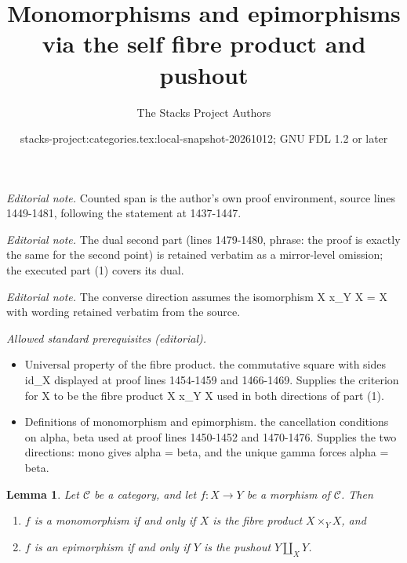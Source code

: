 \documentclass{stacks-project}
\title{Monomorphisms and epimorphisms via the self fibre product and pushout}
\author{The Stacks Project Authors}
\date{stacks-project:categories.tex:local-snapshot-20261012; GNU FDL 1.2 or later}
\theoremstyle{plain}
\newtheorem{lemma}[subsection]{Lemma}
\theoremstyle{definition}
\theoremstyle{remark}
\numberwithin{equation}{subsection}
\begin{document}
\maketitle
\noindent\textit{Editorial note.} Counted span is the author's own proof environment, source lines 1449-1481, following the statement at 1437-1447.\par\medskip
\noindent\textit{Editorial note.} The dual second part (lines 1479-1480, phrase: the proof is exactly the same for the second point) is retained verbatim as a mirror-level omission; the executed part (1) covers its dual.\par\medskip
\noindent\textit{Editorial note.} The converse direction assumes the isomorphism X x\_Y X = X with wording retained verbatim from the source.\par\medskip
\noindent\textit{Allowed standard prerequisites (editorial).}\begin{itemize}
\item Universal property of the fibre product. the commutative square with sides id\_X displayed at proof lines 1454-1459 and 1466-1469. Supplies the criterion for X to be the fibre product X x\_Y X used in both directions of part (1).
\item Definitions of monomorphism and epimorphism. the cancellation conditions on alpha, beta used at proof lines 1450-1452 and 1470-1476. Supplies the two directions: mono gives alpha = beta, and the unique gamma forces alpha = beta.
\end{itemize}\medskip
\begin{lemma}
\label{lemma-characterize-mono-epi}
Let $\mathcal{C}$ be a category, and let $f : X \to Y$ be
a morphism of $\mathcal{C}$. Then
\begin{enumerate}
\item $f$ is a monomorphism if and only if $X$ is the fibre
product $X \times_Y X$, and
\item $f$ is an epimorphism if and only if $Y$ is the pushout
$Y \amalg_X Y$.
\end{enumerate}
\end{lemma}
\end{document}
